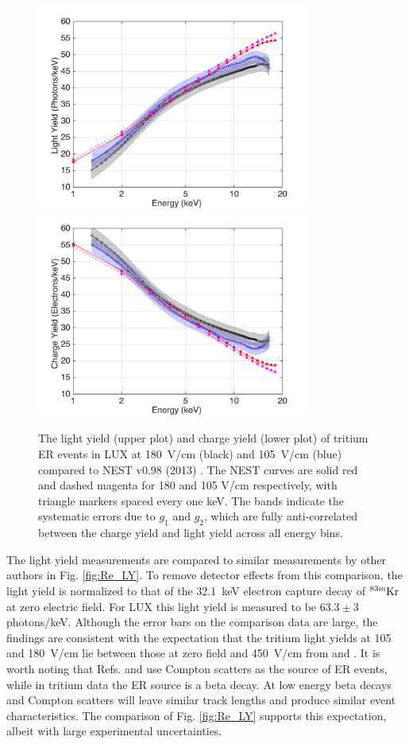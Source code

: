 \begin{figure}[h!]
\includegraphics[width=90mm]{fig/ER_LY.png}
\includegraphics[width=90mm]{fig/ER_QY.png}
\caption{The light yield (upper plot) and charge yield (lower plot) of tritium ER events in LUX at 180~V/cm (black) and 105~V/cm (blue) compared to NEST v0.98 (2013) \cite{NEST_2013}. The NEST curves are solid red and dashed magenta for 180 and 105 V/cm respectively, with triangle markers spaced every one keV. The bands indicate the systematic errors due to $g_1$ and $g_2$, which are fully anti-correlated between the charge yield and light yield across all energy bins. }
\label{fig:ER-LY-QY}
\end{figure}

The light yield measurements are compared to similar measurements by other authors in Fig. \ref{fig:Re_LY}. To remove detector effects from this comparison, the light yield is normalized to that of the 32.1~keV electron capture decay of $\rm ^{83m} Kr$ at zero electric field. For LUX this light yield is measured to be $ 63.3 \pm 3$ photons/keV. Although the error bars on the comparison data are large, the findings are consistent with the expectation that the tritium light yields at 105 and 180~V/cm lie between those at zero field and 450~V/cm from \cite{Aprile_LY} and \cite{Baudis}. It is worth noting that Refs. \cite{Aprile_LY} and \cite{Baudis} use Compton scatters as the source of ER events, while in tritium data the ER source is a beta decay. At low energy beta decays and Compton scatters will leave similar track lengths and produce similar event characteristics. The comparison of Fig. \ref{fig:Re_LY} supports this expectation, albeit with large experimental uncertainties.

